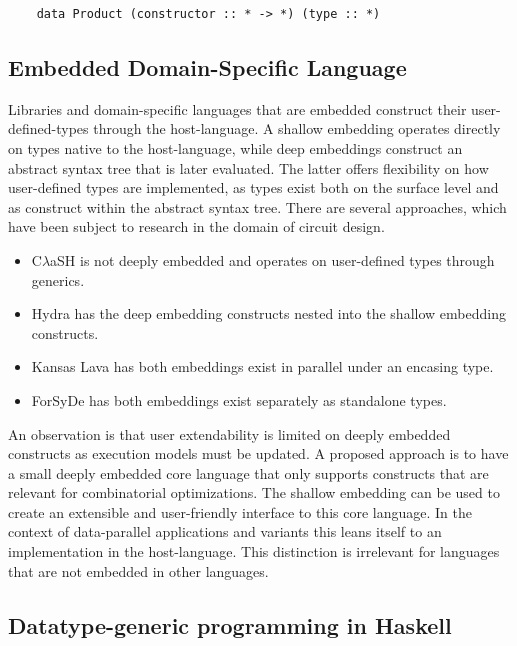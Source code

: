 \documentclass{article}
\begin{document}
\begin{verbatim}
    data Product (constructor :: * -> *) (type :: *)
\end{verbatim}


\subsection{Embedded Domain-Specific Language}

Libraries and domain-specific languages that are embedded construct their user-defined-types through the host-language.
A shallow embedding operates directly on types native to the host-language, while deep embeddings construct an abstract syntax tree that is later evaluated.
The latter offers flexibility on how user-defined types are implemented, as types exist both on the surface level and as construct within the abstract syntax tree.   
There are several approaches, which have been subject to research in the domain of circuit design.

\begin{itemize}
    \setlength\itemsep{0em}
    \item {C$\lambda$aSH} is not deeply embedded and operates on user-defined types through generics\cite{clash}. 
    \item Hydra has the deep embedding constructs nested into the shallow embedding constructs\cite{hydra}.
    \item Kansas Lava has both embeddings exist in parallel under an encasing type\cite{kansas-lava}.
    \item ForSyDe has both embeddings exist separately as standalone types\cite{forsyde}.
\end{itemize}

An observation is that user extendability is limited on deeply embedded constructs as execution models must be updated.
A proposed approach is to have a small deeply embedded core language that only supports constructs that are relevant for combinatorial optimizations\cite{shallow-and-deep}. 
The shallow embedding can be used to create an extensible and user-friendly interface to this core language.
In the context of data-parallel applications and variants this leans itself to an implementation in the host-language.
This distinction is irrelevant for languages that are not embedded in other languages.

\subsection{Datatype-generic programming in Haskell}
\end{document}
